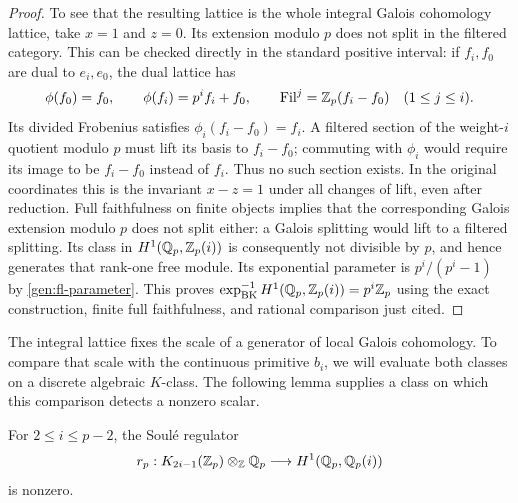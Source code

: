 \begin{proof}
To see that the resulting lattice is the whole integral Galois
cohomology lattice, take $x=1$ and $z=0$.  Its extension modulo $p$
does not split in the filtered category.  This can be checked directly
in the standard positive interval: if $f_i,f_0$ are dual to $e_i,e_0$,
the dual lattice has
\[
 \phi(f_0)=f_0,\qquad \phi(f_i)=p^if_i+f_0,\qquad
 \operatorname{Fil}^{j}=\mathbb Z_p(f_i-f_0)\quad(1\leq j\leq i).
\]
Its divided Frobenius satisfies $\phi_i(f_i-f_0)=f_i$.
A filtered section of the weight-$i$ quotient modulo $p$ must lift
its basis to $f_i-f_0$; commuting with $\phi_i$ would require its
image to be $f_i-f_0$ instead of $f_i$.  Thus no such section exists.
In the original coordinates this is the invariant $x-z=1$ under
all changes of lift, even after reduction.
Full faithfulness on finite objects implies that the corresponding
Galois extension modulo $p$ does not split either: a Galois splitting
would lift to a filtered splitting.  Its class in
$H^1(\mathbb Q_p,\mathbb Z_p(i))$ is consequently not divisible by $p$, and hence
generates that rank-one free module.  Its exponential parameter is
$p^i/(p^i-1)$ by \eqref{gen:fl-parameter}.  This proves
$\exp_{\mathrm{BK}}^{-1}H^1(\mathbb Q_p,\mathbb Z_p(i))=p^i\mathbb Z_p$ using the
exact construction, finite full faithfulness, and rational
comparison just cited.
\end{proof}

The integral lattice fixes the scale of a generator of local Galois
cohomology.  To compare that scale with the continuous primitive
$b_i$, we will evaluate both classes on a discrete algebraic $K$-class.
The following lemma supplies a class on which this comparison detects
a nonzero scalar.

\begin{lemma}
\label{gen:detected-regulator}
For $2\leq i\leq p-2$, the Soul\'e regulator
\[
 r_p:K_{2i-1}(\mathbb Z_p)\otimes_{\mathbb Z}\mathbb Q_p
       \longrightarrow H^1(\mathbb Q_p,\mathbb Q_p(i))
\]
is nonzero.
\end{lemma}

